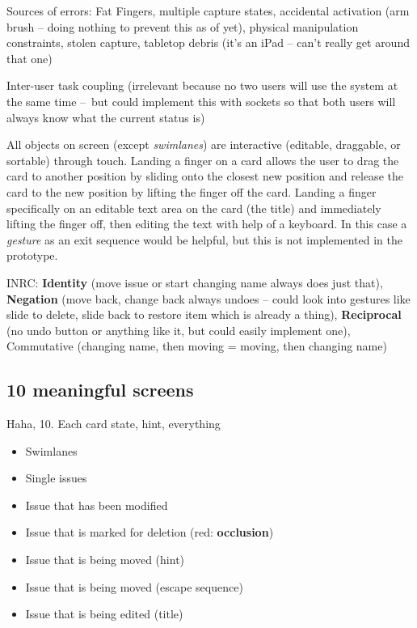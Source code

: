 Sources of errors: Fat Fingers, multiple capture states, accidental activation (arm brush – doing nothing to prevent this as of yet), physical manipulation constraints, stolen capture, tabletop debris (it's an iPad – can't really get around that one)

Inter-user task coupling (irrelevant because no two users will use the system at the same time – but could implement this with sockets so that both users will always know what the current status is)


All objects on screen (except \textit{swimlanes}) are interactive (editable, draggable, or sortable) through touch. Landing a finger on a card allows the user to drag the card to another position by sliding onto the closest new position and release the card to the new position by lifting the finger off the card. Landing a finger specifically on an editable text area on the card (the title) and immediately lifting the finger off, then editing the text with help of a keyboard. In this case a \textit{gesture} \parencite[157]{wigdow-wixon:brave-nui-world:2011} as an exit sequence would be helpful, but this is not implemented in the prototype.

INRC: \textbf{Identity} (move issue or start changing name always does just that), \textbf{Negation} (move back, change back always undoes – could look into gestures like slide to delete, slide back to restore item which is already a thing), \textbf{Reciprocal} (no undo button or anything like it, but could easily implement one), Commutative (changing name, then moving = moving, then changing name) %

\subsection{10 meaningful screens}

Haha, 10. Each card state, hint, everything


\begin{itemize}
  \item Swimlanes
  \item Single issues
  \item Issue that has been modified
  \item Issue that is marked for deletion (red: \textbf{occlusion}) 
  \item Issue that is being moved (hint)
  \item Issue that is being moved (escape sequence)
  \item Issue that is being edited (title)
\end{itemize}

